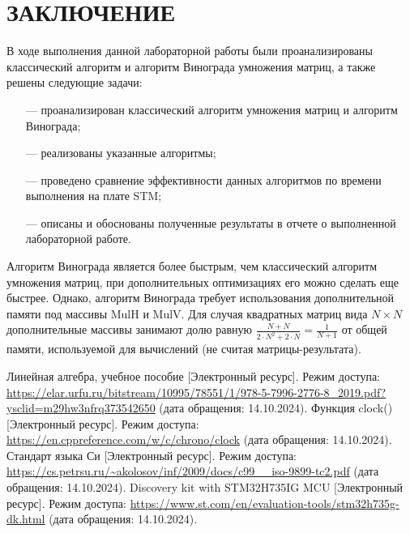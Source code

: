 \documentclass{bmstu}
\begin{document}
\chapter*{ЗАКЛЮЧЕНИЕ}

В ходе выполнения данной лабораторной работы были проанализированы классический алгоритм и алгоритм Винограда умножения матриц, а также решены следующие задачи:
\begin{itemize}
	\item[---] проанализирован классический алгоритм умножения матриц и алгоритм Винограда;
	\item[---] реализованы указанные алгоритмы;
	\item[---] проведено сравнение эффективности данных алгоритмов по времени выполнения на плате STM;
        \item[---] описаны и обоснованы полученные результаты в отчете о выполненной лабораторной работе.
\end{itemize}

Алгоритм Винограда является более быстрым, чем классический алгоритм умножения матриц, при дополнительных оптимизациях его можно сделать еще быстрее. Однако, алгоритм Винограда требует использования дополнительной памяти под массивы MulH и MulV. Для случая квадратных матриц вида $N \times N$ дополнительные массивы занимают долю равную $\frac{N + N}{2\cdot N^2 + 2\cdot N} = \frac{1}{N + 1}$ от общей памяти, используемой для вычислений (не считая матрицы-результата).

\vspace{5mm}

\renewcommand{\bibname}{СПИСОК ИСПОЛЬЗОВАННЫХ ИСТОЧНИКОВ}
\begin{thebibliography}{5}
	Линейная алгебра, учебное пособие [Электронный ресурс]. Режим доступа: \url{https://elar.urfu.ru/bitstream/10995/78551/1/978-5-7996-2776-8_2019.pdf?ysclid=m29hw3nfrq373542650} (дата обращения: 14.10.2024).
	Функция clock() [Электронный ресурс]. Режим доступа: \url{https://en.cppreference.com/w/c/chrono/clock} (дата обращения: 14.10.2024).
	Стандарт языка Си [Электронный ресурс]. Режим доступа: \url{https://cs.petrsu.ru/~akolosov/inf/2009/docs/c99__iso-9899-tc2.pdf} (дата обращения: 14.10.2024).
	Discovery kit with STM32H735IG MCU [Электронный ресурс]. Режим доступа: \url{https://www.st.com/en/evaluation-tools/stm32h735g-dk.html} (дата обращения: 14.10.2024).
\end{thebibliography}

\end{document}
